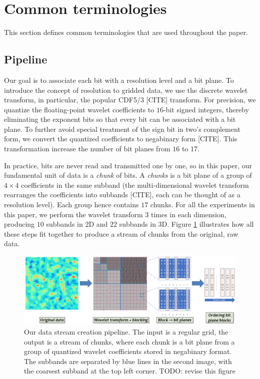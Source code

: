 \section{Common terminologies}

This section defines common terminologies that are used throughout the paper.

\subsection{Pipeline}

Our goal is to associate each bit with a resolution level and a bit plane. To introduce the concept
of resolution to gridded data, we use the discrete wavelet transform, in particular, the popular
CDF5/3 [CITE] transform. For precision, we quantize the floating-point wavelet coefficients to
$16$-bit signed integers, thereby eliminating the exponent bits so that every bit can be associated
with a bit plane. To further avoid special treatment of the sign bit in two's complement form, we
convert the quantized coefficients to negabinary form [CITE]. This transformation increase the
number of bit planes from $16$ to $17$.

In practice, bits are never read and transmitted one by one, so in this paper, our fundamental unit
of data is a \emph{chunk} of bits. A \emph{chunks} is a bit plane of a group of $4\times 4$
coefficients in the same subband (the multi-dimensional wavelet transform rearranges the
coefficients into subbands [CITE], each can be thought of as a resolution level). Each group hence
contains $17$ chunks. For all the experiments in this paper, we perform the wavelet transform $3$
times in each dimension, producing $10$ subbands in 2D and $22$ subbands in 3D. Figure
\ref{fig:pipeline} illustrates how all these steps fit together to produce a stream of chunks from
the original, raw data.

\begin{figure}
  \centering
  \includegraphics[width=\linewidth]{img/pipeline.png}
  \caption{Our data stream creation pipeline. The input is a regular grid, the output is a stream of
  chunks, where each chunk is a bit plane from a group of quantized wavelet coefficients stored in
  negabinary format. The subbands are separated by blue lines in the second image, with the coarsest
  subband at the top left corner. TODO: revise this figure}
  \label{fig:pipeline}
\end{figure}

